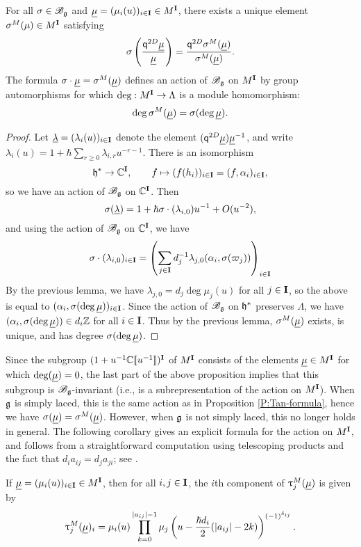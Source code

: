 \begin{proposition}\label{P:Bg-action-M}
    For all $\sigma\in\mathscr{B}_{\mathfrak{g}}$ and $\underline{\mu} = (\mu_i(u))_{i\in\mathbf{I}} \in M^{\mathbf{I}}$, there exists a unique element $\sigma^M(\mu)\in M^{\mathbf{I}}$ satisfying
    \[\sigma\left(\frac{\mathsf{q}^{2D}\underline{\mu}}{\underline{\mu}}\right) = \frac{\mathsf{q}^{2D}\sigma^M(\underline{\mu})}{\sigma^M(\underline{\mu})}.\]
    The formula $\sigma\cdot\underline{\mu} = \sigma^M(\underline{\mu})$ defines an action of $\mathscr{B}_{\mathfrak{g}}$ on $M^{\mathbf{I}}$ by group automorphisms for which $\deg:M^{\mathbf{I}}\to\Lambda$ is a module homomorphism:
    \[\deg\sigma^M(\underline{\mu}) = \sigma(\deg\underline{\mu}).\]
\end{proposition}
\begin{proof}
    Let $\underline{\lambda} = (\lambda_i(u))_{i\in\mathbf{I}}$ denote the element $(\mathsf{q}^{2D}\underline{\mu})\underline{\mu}^{-1}$, and write $\lambda_i(u) = 1+\hbar\sum_{r\geq 0}\lambda_{i,r}u^{-r-1}$.
    There is an isomorphism
    \[\mathfrak{h}^*\to\mathbb{C}^{\mathbf{I}}, \qquad f\mapsto (f(h_i))_{i\in\mathbf{I}} = (f, \alpha_i)_{i\in\mathbf{I}},\]
    so we have an action of $\mathscr{B}_{\mathfrak{g}}$ on $\mathbb{C}^{\mathbf{I}}$.
    Then
    \[\sigma(\underline{\lambda}) = 1 + \hbar\sigma\cdot(\lambda_{i,0})u^{-1} + O(u^{-2}),\]
    and using the action of $\mathscr{B}_{\mathfrak{g}}$ on $\mathbb{C}^{\mathbf{I}}$, we have
    \[\sigma\cdot(\lambda_{i,0})_{i\in\mathbf{I}} = \left(\sum_{j\in\mathbf{I}}d_j^{-1}\lambda_{j,0}(\alpha_i,\sigma(\varpi_j))\right)_{i\in\mathbf{I}}\]
    By the previous lemma, we have $\lambda_{j,0} = d_j\deg\mu_j(u)$ for all $j\in\mathbf{I}$, so the above is equal to $(\alpha_i,\sigma(\deg\underline{\mu}))_{i\in\mathbf{I}}$.
    Since the action of $\mathscr{B}_{\mathfrak{g}}$ on $\mathfrak{h}^*$ preserves $\Lambda$, we have $(\alpha_i,\sigma(\deg\underline{\mu}))\in d_i\mathbb{Z}$ for all $i\in\mathbf{I}$.
    Thus by the previous lemma, $\sigma^M(\underline{\mu})$ exists, is unique, and has degree $\sigma(\deg\underline{\mu})$.
\end{proof}

Since the subgroup $(1+u^{-1}\mathbb{C}[\![u^{-1}]\!])^{\mathbf{I}}$ of $M^{\mathbf{I}}$ consists of the elements $\underline{\mu}\in M^{\mathbf{I}}$ for which $\deg(\underline{\mu}) = 0$, the last part of the above proposition implies that this subgroup is $\mathscr{B}_{\mathfrak{g}}$-invariant (i.e., is a subrepresentation of the action on $M^{\mathbf{I}}$).
When $\mathfrak{g}$ is simply laced, this is the same action as in Proposition \ref{P:Tan-formula}, hence we have $\sigma(\underline{\mu}) = \sigma^M(\underline{\mu})$.
However, when $\mathfrak{g}$ is not simply laced, this no longer holds in general.
The following corollary gives an explicit formula for the action on $M^{\mathbf{I}}$, and follows from a straightforward computation using telescoping products and the fact that $d_ia_{ij} = d_ja_{ji}$; see \cite[Cor. 4.5]{friesen_braid_2024}.

\begin{corollary}\label{C:Langlands}
    If $\underline{\mu} = (\mu_i(u))_{i\in\mathbf{I}}\in M^{\mathbf{I}}$, then for all $i,j\in\mathbf{I}$, the $i$th component of $\uptau_j^M(\underline{\mu})$ is given by
    \[\uptau_j^M(\underline{\mu})_i = \mu_i(u)\prod_{k=0}^{\lvert a_{ij}\rvert-1}\mu_j\left(u-\frac{\hbar d_i}{2}(\lvert a_{ij}\rvert-2k)\right)^{(-1)^{\delta_{ij}}}.\]
\end{corollary}


